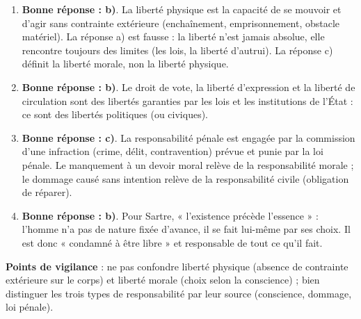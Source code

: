 \documentclass[11pt]{article}
\begin{document}
\begin{corrige}
\begin{enumerate}
\item \textbf{Bonne réponse : b)}. La liberté physique est la capacité de se mouvoir et d'agir sans contrainte extérieure (enchaînement, emprisonnement, obstacle matériel). La réponse a) est fausse : la liberté n'est jamais absolue, elle rencontre toujours des limites (les lois, la liberté d'autrui). La réponse c) définit la liberté morale, non la liberté physique.
\item \textbf{Bonne réponse : b)}. Le droit de vote, la liberté d'expression et la liberté de circulation sont des libertés garanties par les lois et les institutions de l'État : ce sont des libertés politiques (ou civiques).
\item \textbf{Bonne réponse : c)}. La responsabilité pénale est engagée par la commission d'une infraction (crime, délit, contravention) prévue et punie par la loi pénale. Le manquement à un devoir moral relève de la responsabilité morale ; le dommage causé sans intention relève de la responsabilité civile (obligation de réparer).
\item \textbf{Bonne réponse : b)}. Pour Sartre, « l'existence précède l'essence » : l'homme n'a pas de nature fixée d'avance, il se fait lui-même par ses choix. Il est donc « condamné à être libre » et responsable de tout ce qu'il fait.
\end{enumerate}
\textbf{Points de vigilance} : ne pas confondre liberté physique (absence de contrainte extérieure sur le corps) et liberté morale (choix selon la conscience) ; bien distinguer les trois types de responsabilité par leur source (conscience, dommage, loi pénale).
\end{corrige}
\end{document}
